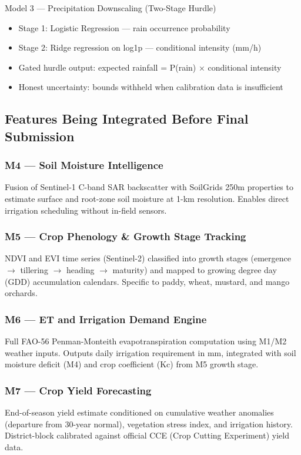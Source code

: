 \documentclass[12pt,a4paper]{article}
\begin{document}
\begin{kpibox}{Model 3 --- Precipitation Downscaling (Two-Stage Hurdle)}
\begin{itemize}[leftmargin=*,noitemsep]
  \item Stage 1: Logistic Regression --- rain occurrence probability
  \item Stage 2: Ridge regression on log1p --- conditional intensity (mm/h)
  \item Gated hurdle output: expected rainfall = P(rain) $\times$ conditional intensity
  \item Honest uncertainty: bounds withheld when calibration data is insufficient
\end{itemize}
\end{kpibox}

\subsection{Features Being Integrated Before Final Submission}

\subsubsection{M4 --- Soil Moisture Intelligence}
Fusion of Sentinel-1 C-band SAR backscatter with SoilGrids 250m properties to estimate surface and root-zone soil moisture at 1-km resolution. Enables direct irrigation scheduling without in-field sensors.

\subsubsection{M5 --- Crop Phenology \& Growth Stage Tracking}
NDVI and EVI time series (Sentinel-2) classified into growth stages (emergence $\rightarrow$ tillering $\rightarrow$ heading $\rightarrow$ maturity) and mapped to growing degree day (GDD) accumulation calendars. Specific to paddy, wheat, mustard, and mango orchards.

\subsubsection{M6 --- ET and Irrigation Demand Engine}
Full FAO-56 Penman-Monteith evapotranspiration computation using M1/M2 weather inputs. Outputs daily irrigation requirement in mm, integrated with soil moisture deficit (M4) and crop coefficient (Kc) from M5 growth stage.

\subsubsection{M7 --- Crop Yield Forecasting}
End-of-season yield estimate conditioned on cumulative weather anomalies (departure from 30-year normal), vegetation stress index, and irrigation history. District-block calibrated against official CCE (Crop Cutting Experiment) yield data.
\end{document}

